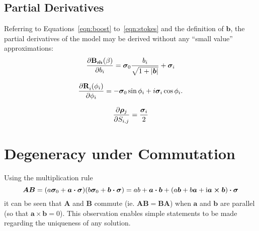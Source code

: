 \documentclass[12pt]{article}
\newcommand{\Ci}{{\rm i}}
\newcommand{\rotation}[3]{{\ensuremath{ {\bf R}^{#3}_{#1}({#2}) }}}
\newcommand{\boost}[1][m]{{\ensuremath{ {\bf B}_{\bm{\hat {#1}}}(\beta) }}}
\begin{document}
\subsection{Partial Derivatives}
Referring to Equations~\ref{eqn:boost} to~\ref{eqn:stokes} and the definition
of $\bm{b}$, the partial derivatives of the model may be derived without
any ``small value'' approximations:
\begin{equation}
{\partial\boost\over\partial b_i} =
	\bm{\sigma}_0{b_i\over\sqrt{1+|\bm{b}|}} + \bm{\sigma}_i
\end{equation}

\begin{equation}
{\partial\rotation{i}{\phi_i}{ }\over\partial \phi_i} = 
	-\bm{\sigma}_0\sin\phi_i + i\bm{\sigma}_i\cos\phi_i.
\end{equation}

\begin{equation}
{\partial{\bm\rho}_j\over\partial S_{i,j}} = {\bm{\sigma}_i\over2}
\end{equation}


\section{Degeneracy under Commutation}

Using the multiplication rule
\begin{equation}
\bm{AB}=(a\bm{\sigma}_0+\bm{a\cdot\sigma})(b\bm{\sigma}_0 + \bm{b\cdot\sigma})
= ab + \bm{a\cdot b} + (a\bm{b} + b\bm{a} + \Ci \bm{a\times b})\bm{\cdot\sigma}
\end{equation}
it can be seen that $\bm{A}$ and $\bm{B}$ commute
(ie. $\bm{AB}=\bm{BA}$) when $\bm{a}$ and $\bm{b}$ are parallel (so
that $\bm{a\times b}=0$).  This observation enables simple statements to
be made regarding the uniqueness of any solution.
\end{document}
